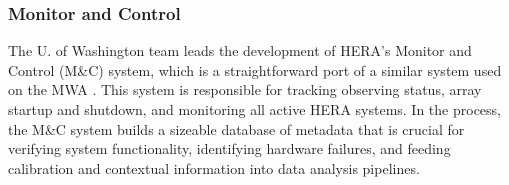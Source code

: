 \documentclass[preprint]{aastex}
\newcommand{\Mycitep}[1]{{\bf \citep{#1}}}
\newcommand{\compress}{\vspace{-0.25in}}
\begin{document}


\compress
\subsubsection{Monitor and Control}
\label{sec:monitor}

The U. of Washington team leads the development of HERA's Monitor and Control (M\&C) system,
which is a straightforward port of a similar system used on the MWA \Mycitep{tingay_et_al2013}.
This system is
responsible for tracking observing status, array startup and shutdown, and
monitoring all active HERA systems. In the process, the M\&C system builds a sizeable database of 
metadata that is crucial for verifying system functionality, identifying hardware failures, and feeding
calibration and contextual information into data analysis pipelines.  

%
%
\end{document}
